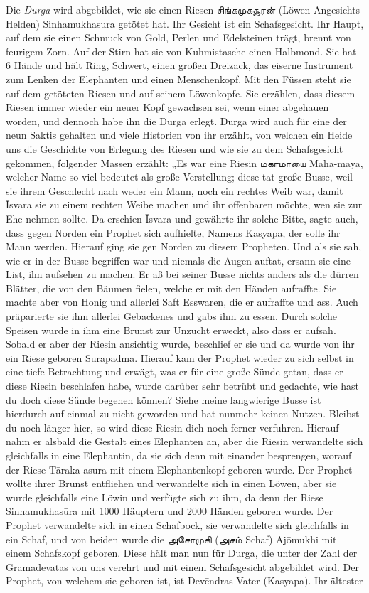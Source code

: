 \documentclass{article}
\newcommand{\TamilText}[1]{\texttamil{#1}}
\newcommand{\tam}[1]{\TamilText{#1}}
\begin{document}
Die \emph{Durga} wird abgebildet, wie sie einen Riesen \tam{சிங்கமுகசூரன்} (Löwen-Angesichts-Helden) Sinhamukhasura getötet hat. Ihr Gesicht ist ein Schafsgesicht. Ihr Haupt, auf dem sie einen Schmuck von Gold, Perlen und Edelsteinen trägt, brennt von feurigem Zorn. Auf der Stirn hat sie von Kuhmistasche einen Halbmond. Sie hat 6 Hände und hält Ring, Schwert, einen großen Dreizack, das eiserne Instrument zum Lenken der Elephanten und einen Menschenkopf. Mit den Füssen steht sie auf dem getöteten Riesen und auf seinem Löwenkopfe. Sie erzählen, dass diesem Riesen immer wieder ein neuer Kopf gewachsen sei, wenn einer abgehauen worden, und dennoch habe ihn die Durga erlegt. Durga wird auch für eine der neun Saktis gehalten und viele Historien von ihr erzählt, von welchen ein Heide uns die Geschichte von Erlegung des Riesen und wie sie zu dem Schafsgesicht gekommen, folgender Massen erzählt: „Es war eine Riesin \tam{மகாமாயை} Mah\={a}-m\={a}ya, welcher Name so viel bedeutet als große Verstellung; diese tat große Busse, weil sie ihrem Geschlecht nach weder ein Mann, noch ein rechtes Weib war, damit \={I}svara sie zu einem rechten Weibe machen und ihr offenbaren möchte, wen sie zur Ehe nehmen sollte. Da erschien \={I}svara und gewährte ihr solche Bitte, sagte auch, dass gegen Norden ein Prophet sich aufhielte, Namens Kasyapa, der solle ihr Mann werden. Hierauf ging sie gen Norden zu diesem Propheten. Und als sie sah, wie er in der Busse begriffen war und niemals die Augen auftat, ersann sie eine List, ihn aufsehen zu machen. Er aß bei seiner Busse nichts anders als die dürren Blätter, die von den Bäumen fielen, welche er mit den Händen aufraffte. Sie machte aber von Honig und allerlei Saft Esswaren, die er aufraffte und ass. Auch präparierte sie ihm allerlei Gebackenes und gabs ihm zu essen. Durch solche Speisen wurde in ihm eine Brunst zur Unzucht erweckt, also dass er aufsah. Sobald er aber der Riesin ansichtig wurde, beschlief er sie und da wurde von ihr ein Riese geboren S\={u}rapadma. Hierauf kam der Prophet wieder zu sich selbst in eine tiefe Betrachtung und erwägt, was er für eine große Sünde getan, dass er diese Riesin beschlafen habe, wurde darüber sehr betrübt und gedachte, wie hast du doch diese Sünde begehen können? Siehe meine langwierige Busse ist hierdurch auf einmal zu nicht geworden und hat nunmehr keinen Nutzen. Bleibst du noch länger hier, so wird diese Riesin dich noch ferner verfuhren. Hierauf nahm er alsbald die Gestalt eines Elephanten an, aber die Riesin verwandelte sich gleichfalls in eine Elephantin, da sie sich denn mit einander besprengen, worauf der Riese T\={a}raka-asura mit einem Elephantenkopf geboren wurde. Der Prophet wollte ihrer Brunst entfliehen und verwandelte sich in einen Löwen, aber sie wurde gleichfalls eine Löwin und verfügte sich zu ihm, da denn der Riese Sinhamukhas\={u}ra mit 1000 Häuptern und 2000 Händen geboren wurde. Der Prophet verwandelte sich in einen Schafbock, sie verwandelte sich gleichfalls in ein Schaf, und von beiden wurde die \tam{அசோமுகி} (\tam{அசம்} Schaf) Aj\={o}mukhi mit einem Schafskopf geboren. Diese hält man nun für Durga, die unter der Zahl der Gr\={a}mad\={e}vatas von uns verehrt und mit einem Schafsgesicht abgebildet wird. Der Prophet, von welchem sie geboren ist, ist Dev\={e}ndras Vater (Kasyapa). Ihr ältester 
\end{document}
